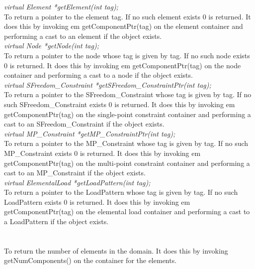 {{\em virtual  Element *getElement(int tag);}\\
To return a pointer to the element \p tag. If no such element
exists $0$ is returned. It does this by invoking {em
getComponentPtr(tag)} on the element container and performing a cast
to an element if the object exists. \\

{\em virtual  Node *getNode(int tag);}\\
To return a pointer to the node whose tag is given by \p tag. If
no such node exists $0$ is returned. It does this by invoking {em
getComponentPtr(tag)} on the node container and performing a cast
to a node if the object exists. \\

{\em virtual  SFreedom\_Constraint *getSFreedom\_ConstraintPtr(int tag);}\\
To return a pointer to the SFreedom\_Constraint whose tag is given by \p tag. If
no such SFreedom\_Constraint exists $0$ is returned. It does this by invoking {em
getComponentPtr(tag)} on the single-point constraint container and
performing a cast to an SFreedom\_Constraint if the object exists. \\


{\em virtual  MP\_Constraint *getMP\_ConstraintPtr(int tag);}\\
To return a pointer to the MP\_Constraint whose tag is given by \p tag. If
no such MP\_Constraint exists $0$ is returned. It does this by invoking {em
getComponentPtr(tag)} on the multi-point constraint container and
performing a cast to an MP\_Constraint if the object exists. \\


{\em virtual  ElementalLoad *getLoadPattern(int tag);}\\
To return a pointer to the LoadPattern whose tag is given by \p tag. If
no such LoadPattern exists $0$ is returned. It does this by invoking {em
getComponentPtr(tag)} on the elemental load container and
performing a cast to a LoadPattern if the object exists. \\


 \\
\\
To return the number of elements in the domain. It does this by
invoking getNumComponents() on the container for the elements. \\

}
